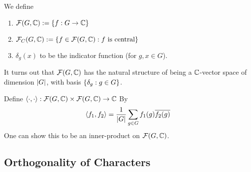 \begin{boxnotation}
    We define
    \begin{enumerate}
        \item $\mathcal{F}\!\left( G, \mathbb{C} \right) := \left\{ f : G \to \mathbb{C} \right\}$
        \item $\mathcal{F}_C\!\left( G, \mathbb{C} \right) := \left\{ f \in \mathcal{F}\!\left( G, \mathbb{C} \right) : f \text{ is central} \right\}$
        \item $\delta_g(x)$ to be the indicator function (for $g, x \in G$).
    \end{enumerate}
\end{boxnotation}

\begin{remark}
    It turns out that $\mathcal{F}\!\left( G, \mathbb{C} \right)$ has the natural structure of being a $\mathbb{C}$-vector space of dimension $\left\lvert G \right\rvert$, with basis $\left\{ \delta_g : g \in G \right\}$.
\end{remark}

\begin{definition}
    Define $\left\langle \cdot, \cdot \right\rangle : \mathcal{F}\!\left( G, \mathbb{C} \right) \times \mathcal{F}\!\left( G, \mathbb{C} \right) \to \mathbb{C}$ By
    \begin{align}
        \left\langle f_1, f_2 \right\rangle = \frac{1}{\left\lvert G \right\rvert} \sum_{g \in G} f_1(g) \overline{f_2(g)}
    \end{align}
    One can show this to be an inner-product on $\mathcal{F}\!\left( G, \mathbb{C} \right)$.
\end{definition}

\subsection{Orthogonality of Characters}

